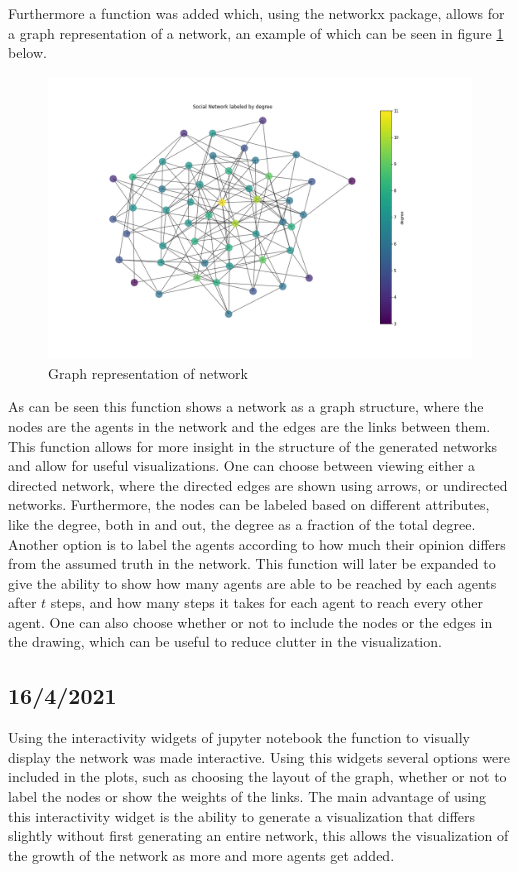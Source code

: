 \documentclass{article}
\begin{document}
Furthermore a function was added which, using the networkx package, allows for a graph representation of a network, an example of which can be seen in figure \ref{graph:degree} below.
\begin{center}
    \begin{figure}[!htbp]
        \centering
        \includegraphics[width=1.3\textwidth]{ThesisKI/Images/DegreeGraph.png}
        \caption{Graph representation of network}
        \label{graph:degree}
    \end{figure}
\end{center}
As can be seen this function shows a network as a graph structure, where the nodes are the agents in the network and the edges are the links between them. This function allows for more insight in the structure of the generated networks and allow for useful visualizations. One can choose between viewing either a directed network, where the directed edges are shown using arrows, or undirected networks. Furthermore, the nodes can be labeled based on different attributes, like the degree, both in and out, the degree as a fraction of the total degree. Another option is to label the agents according to how much their opinion differs from the assumed truth in the network. This function will later be expanded to give the ability to show how many agents are able to be reached by each agents after $t$ steps, and how many steps it takes for each agent to reach every other agent. One can also choose whether or not to include the nodes or the edges in the drawing, which can be useful to reduce clutter in the visualization.

\subsection{16/4/2021}
Using the interactivity widgets of jupyter notebook the function to visually display the network was made interactive. Using this widgets several options were included in the plots, such as choosing the layout of the graph, whether or not to label the nodes or show the weights of the links. The main advantage of using this interactivity widget is the ability to generate a visualization that differs slightly without first generating an entire network, this allows the visualization of the growth of the network as more and more agents get added.
\end{document}
